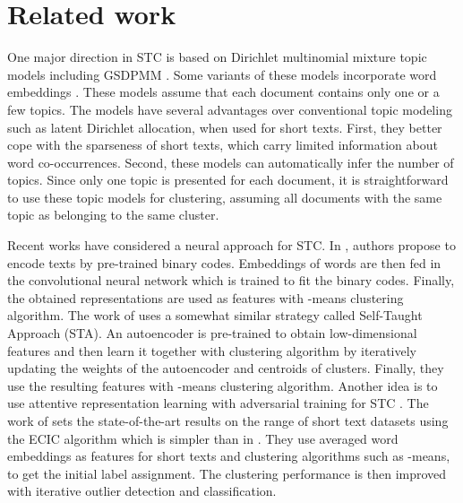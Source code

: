 \documentclass[11pt,a4paper]{article}
\begin{document}
\section{Related work}
One major direction in STC is based on Dirichlet multinomial mixture topic models \cite{yin2014dirichlet,jipeng2019short} including GSDPMM \cite{yin2016model}. Some variants of these models incorporate word embeddings \cite{nguyen2015improving,li2017enhancing,jipeng2019short}. These models assume that each document contains only one or a few topics. The models have several advantages over conventional topic modeling such as latent Dirichlet allocation, when used for short texts. First, they better cope with the sparseness of short texts, which carry limited information about word co-occurrences. Second, these models can automatically infer the number of topics. Since only one topic is presented for each document, it is straightforward to use these topic models for clustering, assuming all documents with the same topic as belonging to the same cluster.

Recent works have considered a neural approach for STC. In \cite{xu2015short, xu2017self}, authors propose to encode texts by pre-trained binary codes. Embeddings of words are then fed in the convolutional neural network which is trained to fit the binary codes. Finally, the obtained representations are used as features with -means clustering algorithm. The work of \cite{hadifar2019self} uses a somewhat similar strategy called Self-Taught Approach (STA). An autoencoder is pre-trained to obtain low-dimensional features and then learn it together with clustering algorithm by iteratively updating the weights of the autoencoder and centroids of clusters. Finally, they use the resulting features with -means clustering algorithm. Another idea is to use attentive representation learning with adversarial training for STC \cite{zhang2019attentive}. The work of \cite{rakib2020enhancement} sets the state-of-the-art results on the range of short text datasets using the ECIC algorithm which is simpler than in \cite{hadifar2019self}. They use averaged word embeddings as features for short texts and clustering algorithms such as -means, to get the initial label assignment. The clustering performance is then improved with iterative outlier detection and classification.
\end{document}
